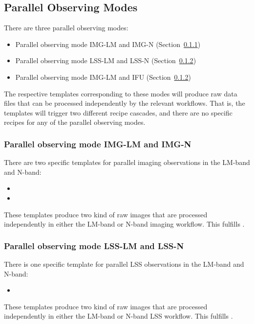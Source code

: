 \FloatBarrier







\subsection{Parallel Observing Modes}
\label{ssec:combinedmodes}

There are three parallel observing modes:

\begin{itemize}
\item Parallel observing mode IMG-LM and IMG-N (Section~\ref{sssec:parallellmnimg})
\item Parallel observing mode LSS-LM and LSS-N (Section~\ref{sssec:parallellmnspec})
\item Parallel observing mode IMG-LM and IFU (Section~\ref{sssec:parallellmnspec})
\end{itemize}

The respective templates corresponding to these modes will produce raw data files that can be processed independently by the relevant workflows.
That is, the templates will trigger two different recipe cascades, and there are no specific recipes for any of the parallel observing modes.

\subsubsection{Parallel observing mode IMG-LM and IMG-N}\label{sssec:parallellmnimg}
There are two specific templates for parallel imaging observations in the LM-band and N-band:
\begin{itemize}
 \item {}
 \item {}
\end{itemize}
These templates produce two kind of raw images that are processed independently in either the LM-band or N-band imaging workflow.
This fulfills .


\subsubsection{Parallel observing mode LSS-LM and LSS-N}\label{sssec:parallellmnspec}
There is one specific template for parallel LSS observations in the LM-band and N-band:
\begin{itemize}
 \item {}
\end{itemize}
These templates produce two kind of raw images that are processed independently in either the LM-band or N-band LSS workflow.
This fulfills .

